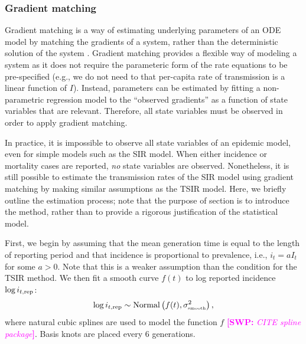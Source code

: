 \documentclass{article}
\newcommand{\comment}[3]{\textcolor{#1}{\textbf{[#2: }\textsl{#3}\textbf{]}}}
\newcommand{\swp}[1]{\comment{magenta}{SWP}{#1}}
\newcommand{\tsub}[2]{#1_{{\textrm{\tiny #2}}}}
\begin{document}
\subsubsection*{Gradient matching}

Gradient matching is a way of estimating underlying parameters of an ODE model by matching the gradients of a system, rather than the deterministic solution of the system \citep{ellner2002fitting}.
Gradient matching provides a flexible way of modeling a system as it does not require the parameteric form of the rate equations to be pre-specified (e.g., we do not need to that per-capita rate of transmission is a linear function of $I$).
Instead, parameters can be estimated by fitting a non-parametric regression model to the ``observed gradients'' as a function of state variables that are relevant.
Therefore, all state variables must be observed in order to apply gradient matching.

In practice, it is impossible to observe all state variables of an epidemic model, even for simple models such as the SIR model.
When either incidence or mortality cases are reported, \emph{no} state variables are observed.
Nonetheless, it is still possible to estimate the transmission rates of the SIR model using gradient matching by making similar assumptions as the TSIR model.
Here, we briefly outline the estimation process; note that the purpose of section is to introduce the method, rather than to provide a rigorous justification of the statistical model.

First, we begin by assuming that the mean generation time is equal to the length of reporting period and that incidence is proportional to prevalence, i.e., $i_t = a I_t$ for some $a > 0$. 
Note that this is a weaker assumption than the condition for the TSIR method.
We then fit a smooth curve $f(t)$ to log reported incidence $\log i_{t, {\tiny \textrm{rep}}}$:
\begin{equation}
\log i_{t, {\tiny \textrm{rep}}} \sim \mathrm{Normal}\left(f(t), \tsub{\sigma}{smooth}^2 \right),
\end{equation}
where natural cubic splines are used to model the function $f$ \swp{CITE spline package}.
Basis knots are placed every 6 generations.
\end{document}
